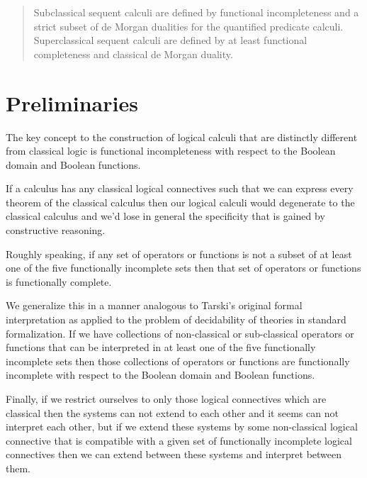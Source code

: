 


\begin{abstract}
Subclassical sequent calculi are defined by functional incompleteness and a strict subset of de Morgan dualities for the quantified predicate calculi.
Superclassical sequent calculi are defined by at least functional completeness and classical de Morgan duality.
\end{abstract}

\part{Preliminaries}
\begin{center}
	\begin{flushleft}
		The key concept to the construction of logical calculi that are distinctly different from classical logic is functional incompleteness with respect to the Boolean domain and Boolean functions.
	\end{flushleft}
	\begin{flushleft}
		If a calculus has any classical logical connectives such that we can express every theorem of the classical calculus then our logical calculi would degenerate to the classical calculus and we'd lose in general the specificity that is gained by constructive reasoning.
	\end{flushleft}
	\begin{flushleft}
		Roughly speaking, if any set of operators or functions is not a subset of at least one of the five functionally incomplete sets then that set of operators or functions is functionally complete.
	\end{flushleft}
	\begin{flushleft}
		We generalize this in a manner analogous to Tarski's original formal interpretation as applied to the problem of decidability of theories in standard formalization. If we have collections of non-classical or sub-classical operators or functions that can be interpreted in at least one of the five functionally incomplete sets then those collections of operators or functions are functionally incomplete with respect to the Boolean domain and Boolean functions.
	\end{flushleft}
	\begin{flushleft}
		Finally, if we restrict ourselves to only those logical connectives which are classical then the systems can not extend to each other and it seems can not interpret each other, but if we extend these systems by some non-classical logical connective that is compatible with a given set of functionally incomplete logical connectives then we can extend between these systems and interpret between them.
	\end{flushleft}

\end{center}
